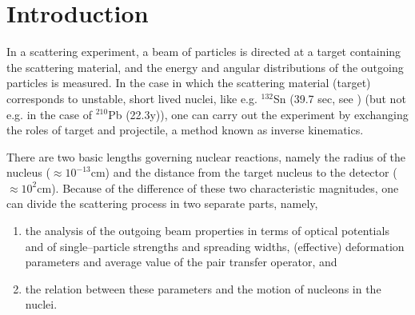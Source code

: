 
\chapter{Introduction}
In a scattering experiment, a beam of particles is directed at a target containing the scattering material, and the energy and angular distributions of the outgoing particles is measured. In the case in which the scattering material (target) corresponds to unstable, short lived nuclei, like e.g. $^{132}$Sn (39.7 sec, see \cite{Jones:10}) (but not e.g. in the case of $^{210}$Pb (22.3y)), one can carry out the experiment by exchanging the roles of target and projectile, a method known as inverse kinematics.

There are two basic lengths governing nuclear reactions, namely the radius of the nucleus ($\approx 10^{-13}$cm) and the distance from the target nucleus to the detector ($\approx 10^2$cm). Because of the difference of these two characteristic magnitudes, one can divide the scattering process in two separate parts, namely,

\begin{enumerate}
\item{the analysis of the outgoing beam properties in terms of optical potentials and of single--particle strengths and spreading widths, (effective) deformation parameters and average value of the pair transfer operator, and}
\item{the relation between these parameters and the motion of nucleons in the nuclei.}
\end{enumerate}

